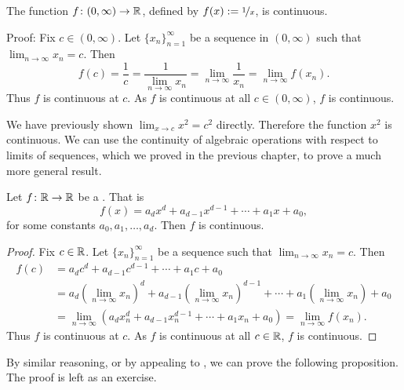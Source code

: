 \begin{example}
The function $f \colon (0,\infty) \to {\mathbb{R}}$,
defined by $f(x) := \nicefrac{1}{x}$, is continuous.

Proof: Fix $c \in (0,\infty)$.  
Let $\{ x_n \}_{n=1}^\infty$ be a sequence in $(0,\infty)$ such that
$\lim_{n\to\infty} x_n = c$.  Then
\begin{equation*}
f(c) = \frac{1}{c}
=
\frac{1}{\lim_{n\to\infty} x_n}
=
\lim_{n \to \infty} \frac{1}{x_n}
=
\lim_{n \to \infty} f(x_n) .
\end{equation*}
Thus $f$ is continuous at $c$.  As $f$ is continuous at all $c \in
(0,\infty)$, $f$ is continuous.
\end{example}

We have previously shown $\lim_{x \to c} x^2 = c^2$ directly.  Therefore
the function $x^2$ is continuous.  We can use the continuity of
algebraic operations with respect to limits of sequences, which we proved in
the previous chapter, to prove a much more general result.

\begin{prop}
Let $f \colon {\mathbb{R}} \to {\mathbb{R}}$ be a \emph{}.  That is
\begin{equation*}
f(x) = a_d x^d + a_{d-1} x^{d-1} + \cdots + a_1 x + a_0 ,
\end{equation*}
for some constants $a_0, a_1, \ldots, a_d$.
Then $f$ is continuous.
\end{prop}

\begin{proof}
Fix $c \in {\mathbb{R}}$.  
Let $\{ x_n \}_{n=1}^\infty$ be a sequence such that
$\lim_{n\to\infty} x_n = c$.  Then
\begin{equation*}
\begin{split}
f(c) &=
a_d c^d + a_{d-1} c^{d-1} + \cdots + a_1 c + a_0 
\\
&= 
a_d {\left(\lim_{n\to\infty} x_n\right)}^d
+ a_{d-1} {\left(\lim_{n\to\infty} x_n\right)}^{d-1}
+ \cdots
+ a_1 \left(\lim_{n\to\infty} x_n\right) + a_0 
\\
& =
\lim_{n \to \infty}
\left(
a_d x_n^d + a_{d-1} x_n^{d-1} + \cdots + a_1 x_n + a_0 
\right)
=
\lim_{n \to \infty}
f(x_n) .
\end{split}
\end{equation*}
Thus $f$ is continuous at $c$.  As $f$ is continuous at all $c \in {\mathbb{R}}$,
$f$ is continuous.
\end{proof}

By similar reasoning, or by appealing to ,
we can prove the following proposition.  The proof is left as an
exercise.

